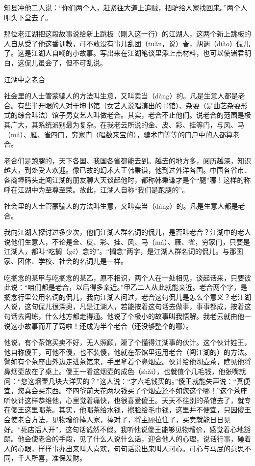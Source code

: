 \documentclass[12pt,UTF8]{ctexbook}
\begin{document}
知县冲他二人说：“你们两个人，赶紧往大道上追贼，把驴给人家找回来。”两个人叩头下堂去了。



那位老江湖把这段故事说给新上跳板（刚入这一行）的江湖人，这两个新上跳板的人自从受了他这番训教，可不敢没有事儿乱团（tuǎn，说）春，胡调（diào）侃儿了。这是江湖人自嘲的小故事。写出来在江湖笔谈里添上点材料，也可以使诸君明白，这侃儿虽会了，但不可乱说。





江湖中之老合


社会里的人士管蒙骗人的方法叫生意，又叫卖当（dàng）的。凡是生意人都是老合。有些半开眼的人对于坤书馆（女艺人说唱演出的书馆）、杂耍（是曲艺杂耍形式的综合叫法）馆子男女艺人叫做老合。其实，老合不止他们。说老合的范围是极其广大，其系统派别最为复杂。在我老云所说的金、皮、彩、挂等门，与风、马（má）、雁、雀四门，穷家门（唱数来宝的），骗术门等等的门户中的人都算老合。

老合们是跑腿的，天下各国、我国各省都能去到。越去的地方多，阅历越深，知识越大，到处受人欢迎。像已故的幻术大王韩秉谦，他到过外洋各国。中国各省市、各商埠码头走闯江湖的朋友聊大天谈起他时，都称韩秉谦才是个“腿”哪！这样的称呼在江湖中为至尊至荣。故此，江湖人自称“我们是跑腿的”。

社会里的人士管蒙骗人的方法叫生意，又叫卖当（dàng）的。凡是生意人都是老合。



我向江湖人探讨过多少次，他们江湖人群名词的侃儿，是否叫老合？江湖中的老人说他们生意人，不论是金、皮、彩、挂、风、马（má）、雁、雀，穷家门，只要是江湖人，都叫“吃搁（gé）念的”。“搁念”两字，是江湖人群名词的侃儿。与那国家、团体、学校、社会的名词儿是一样。

吃搁念的某甲与吃搁念的某乙，原不相识，两个人在一处相见，谈起话来，只要彼此说：“咱们都是老合，以后得多亲近。”甲乙二人从此就能亲近。老合两个字，是搁念行里公用名词的侃儿，我向江湖人问过，老合这句侃儿是怎么个意义？老江湖人说，这句侃儿很深奥，凡是江湖人，若能按着这句话去做事，事事都成，按着这句话去闯练，什么地方都走得通。他说了个极小的故事叫我悟解。我老云就由他一说这小故事而开了窍啦！还成为半个老合（还没够整个的哪）。

他说，有个茶馆买卖不好，无人照顾，雇了个懂得江湖事的伙计。这个伙计姓王，他自称傻王，可他不傻，也不装傻，他就在茶馆里运用老合（闯江湖的）的方法。譬如有个茶座由外边走进茶馆来，手里拿着个鼻烟壶。伙计给他沏壶茶，瞧见他将鼻烟壶放在了桌上。傻王一看这烟壶的成色（shǎi），也就值个几毛钱，他张嘴就问：“您这烟壶几块大洋买的？”这人说：“才六毛钱买的。”傻王就能失声说：“真便宜，您真会买东西。李四爷前天花两块钱买了个烟壶还不如您这个哪！”这个茶座听伙计这样恭维他，心里觉着痛快，也很喜爱傻王。天天不往别的茶馆去了，就专在傻王这里喝茶。其实，他喝茶给水钱，擦脸给毛巾钱，这里并不便宜，只因傻王会使老合方法，见物增价捧人家，捧对了，将主顾拉住了，买卖就能日日见好。“死店活人开”，这句话诚然不假。我听他说傻王能够见物增价，感觉着心地豁朗。他会使老合的手段，见了什么人说什么话，迎合他人的心理，说话行事，碰着人的心眼，样样事办出来叫人喜欢，句句话说出来叫人可心。可心与马屁的意思不同，千人所喜，准保发财。
\end{document}
